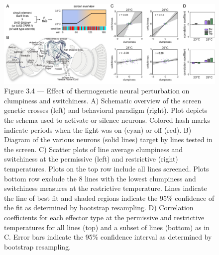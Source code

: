 \documentclass[12pt,letterpaper]{article}
\begin{document}
\begin{figure}[t!]
    \includegraphics[width=\textwidth]{../figures/chapter_3/fig_3-4.pdf}
    \vspace{.1in}
    \caption*{Figure 3.4 — Effect of thermogenetic neural perturbation on clumpiness and switchiness. A) Schematic overview of the screen genetic crosses (left) and behavioral paradigm (right). Plot depicts the schema used to activate or silence neurons. Colored hash marks indicate periods when the light was on (cyan) or off (red). B) Diagram of the various neurons (solid lines) target by lines tested in the screen. C) Scatter plots of line average clumpiness and switchiness at the permissive (left) and restrictive (right) temperatures. Plots on the top row include all lines screened. Plots bottom row  exclude the 8 lines with the lowest clumpiness and switchiness measures at the restrictive temperature. Lines indicate the line of best fit and shaded regions indicate the 95\% confidence of the fit as determined by bootstrap resampling. D) Correlation coefficients for each effector type at the permissive and restrictive temperatures for all lines (top) and a subset of lines (bottom) as in C. Error bars indicate the 95\% confidence interval as determined by bootstrap resampling.}
\end{figure}
\end{document}
